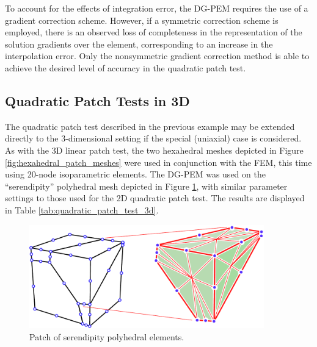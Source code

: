 To account for the effects of integration error, the DG-PEM requires the use of a gradient correction scheme. However, if a symmetric correction scheme is employed, there is an observed loss of completeness in the representation of the solution gradients over the element, corresponding to an increase in the interpolation error. Only the nonsymmetric gradient correction method is able to achieve the desired level of accuracy in the quadratic patch test.

\subsection*{Quadratic Patch Tests in 3D}

The quadratic patch test described in the previous example may be extended directly to the 3-dimensional setting if the special (uniaxial) case is considered. As with the 3D linear patch test, the two hexahedral meshes depicted in Figure \ref{fig:hexahedral_patch_meshes} were used in conjunction with the FEM, this time using 20-node isoparametric elements. The DG-PEM was used on the ``serendipity'' polyhedral mesh depicted in Figure \ref{fig:quadratic_polyhedral_patch_mesh}, with similar parameter settings to those used for the 2D quadratic patch test. The results are displayed in Table \ref{tab:quadratic_patch_test_3d}.

\begin{figure}[!h]
    \centering
    \includegraphics[width=4.0in]{figures/quadratic_polyhedral_patch_mesh.pdf}
    	\caption{Patch of serendipity polyhedral elements.}
    \label{fig:quadratic_polyhedral_patch_mesh}
\end{figure}

